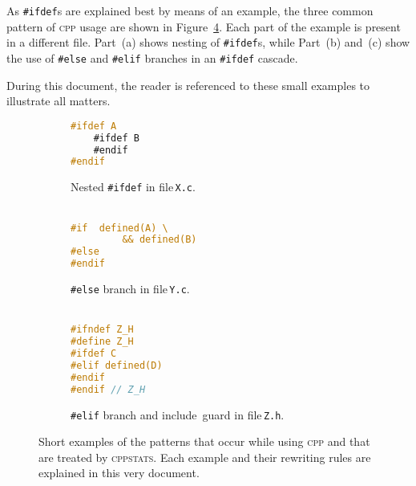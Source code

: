 \documentclass[a4paper]{scrartcl}
\newcommand\code[1]{\texttt{#1}}
\newcommand\tool[1]{\textsc{#1}}
\newcommand\ifdeff[1]{\code{\##1}\xspace}
\newcommand\ifdef[0]{{\upshape\ifdeff{ifdef}}\xspace}
\newcommand\ifdefs[0]{\ifdef{}s\xspace}
\newcommand\cppstats[0]{\tool{cppstats}\xspace}
\newcommand\cpp{\tool{cpp}\xspace}
\begin{document}
As \ifdefs are explained best by means of an example, the three common pattern of \cpp usage are shown in Figure~\ref{fig:examples}.
Each part of the example is present in a different file.
Part~(a) shows nesting of \ifdefs, while Part~(b) and~(c) show the use of \ifdeff{else} and \ifdeff{elif} branches in an \ifdef cascade.

During this document, the reader is referenced to these small examples to illustrate all matters.

\begin{figure}[ht]
        \centering
        \begin{subfigure}[b]{0.3\textwidth}
					\begin{lstlisting}[language=C]
#ifdef A
	#ifdef B
	#endif
#endif
					\end{lstlisting}
					\caption{Nested \ifdef in file\,\code{X.c}.\\\,}
					\label{fig:examples:a}
        \end{subfigure}
        \hfill
        \begin{subfigure}[b]{0.3\textwidth}
					\begin{lstlisting}[language=C, firstnumber=5]
#if  defined(A) \
		 && defined(B)
#else 
#endif
					\end{lstlisting}
					\caption{\ifdeff{else} branch in file\,\code{Y.c}.\\\,}
					\label{fig:examples:b}
        \end{subfigure}
				\hfill
        \begin{subfigure}[b]{0.3\textwidth}
					\begin{lstlisting}[language=C, firstnumber=8]
#ifndef Z_H
#define Z_H
#ifdef C
#elif defined(D)
#endif
#endif // Z_H
					\end{lstlisting}
					\caption{\ifdeff{elif} branch and include~guard in file\,\code{Z.h}.}
					\label{fig:examples:c}
        \end{subfigure}     
        
        \caption{Short examples of the patterns that occur while using \cpp and that are treated by \cppstats. 
        	Each example and their rewriting rules are explained in this very document.}
        \label{fig:examples}
\end{figure}

%
%
%
%
%
%
%
%
%
%
%
%
%
\end{document}
